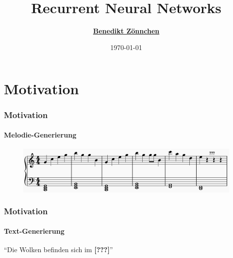 \documentclass[german,aspectratio=169]{beamer}
\title{Recurrent Neural Networks}
\subtitle{}
\author{\href{mailto:zoennchen.benedikt@hm.edu}{\textbf{Benedikt Z\"onnchen}}}
\date{\today}
\begin{document}
	
\begin{frame}
	\titlepage
\end{frame}

\section{Motivation}

\begin{frame}
	\frametitle{Motivation}
	\framesubtitle{Melodie-Generierung}
	\begin{figure}
		\includegraphics[width=\textwidth]{notes.png}
	\end{figure}
\end{frame}

\begin{frame}
	\frametitle{Motivation}
	\framesubtitle{Text-Generierung}
	\begin{center}
		``Die Wolken befinden sich im \textbf{[???]}'' 
	\end{center}
\end{frame}
\end{document}
